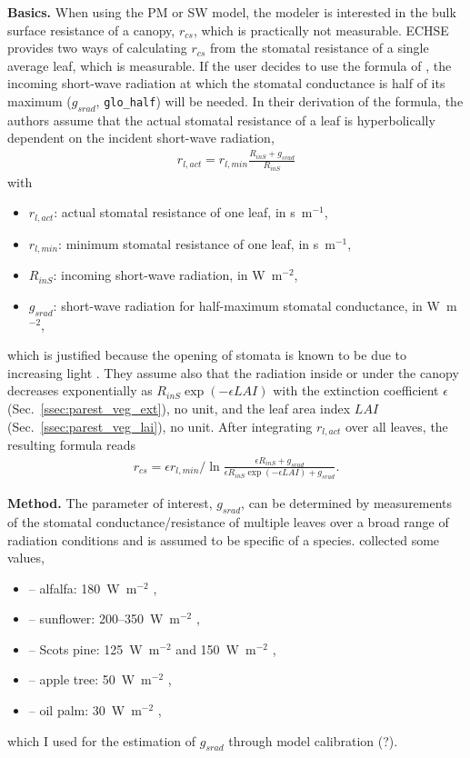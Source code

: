 \documentclass{scrreprt}
\newenvironment{denseitem}{
  \begin{itemize}
    \setlength{\itemsep}{0pt}
    \setlength{\parskip}{0pt}
    \setlength{\parsep}{0pt}
}{
  \end{itemize}
}
\begin{document}
\textbf{Basics.}
When using the PM or SW model, the modeler is interested in the bulk surface resistance of a canopy, $r_{cs}$, which is practically not measurable.
ECHSE provides two ways of calculating $r_{cs}$ from the stomatal resistance of a single average leaf, which is measurable.
If the user decides to use the formula of \citet{saugier91}, the incoming short-wave radiation at which the stomatal conductance is half of its maximum ($g_{srad}$, \verb!glo_half!) will be needed.
In their derivation of the formula, the authors assume that the actual stomatal resistance of a leaf is hyperbolically dependent on the incident short-wave radiation,
\begin{align} \label{eq:glohalf1}
  r_{l,act} = r_{l,min} \frac{R_{inS} + g_{srad}}{R_{inS}}
\end{align}
%
with
\begin{denseitem}
  \item[] $r_{l,act}$: actual stomatal resistance of one leaf, in s~m$^{-1}$,
  \item[] $r_{l,min}$: minimum stomatal resistance of one leaf, in s~m$^{-1}$,
  \item[] $R_{inS}$: incoming short-wave radiation, in W~m$^{-2}$,
  \item[] $g_{srad}$: short-wave radiation for half-maximum stomatal conductance, in W~m$^{-2}$,
\end{denseitem}
%
which is justified because the opening of stomata is known to be due to increasing light \citep{sonnewald13}.
They assume also that the radiation inside or under the canopy decreases exponentially as $R_{inS} \exp(-\epsilon LAI)$ with the extinction coefficient $\epsilon$ (Sec.~\ref{ssec:parest_veg_ext}), no unit, and the leaf area index $LAI$ (Sec.~\ref{ssec:parest_veg_lai}), no unit.
After integrating $r_{l,act}$ over all leaves, the resulting formula reads
\begin{align} \label{eq:glohalf2}
  r_{cs} = \epsilon r_{l,min} / \ln \frac{\epsilon R_{inS} + g_{srad}}{\epsilon R_{inS} \exp(-\epsilon LAI) + g_{srad}}.
\end{align}

\textbf{Method.}
The parameter of interest, $g_{srad}$, can be determined by measurements of the stomatal conductance/resistance of multiple leaves over a broad range of radiation conditions and is assumed to be specific of a species.
\citet{saugier91} collected some values,
\begin{denseitem}
  \item[--] alfalfa: 180~W~m$^{-2}$ \citep{katerji83},
  \item[--] sunflower: 200--350~W~m$^{-2}$ \citep{berger73},
  \item[--] Scots pine: 125~W~m$^{-2}$ \citep{lohammar80} and 150~W~m$^{-2}$ \citep{jarvis81},
  \item[--] apple tree: 50~W~m$^{-2}$ \citep{warrit80},
  \item[--] oil palm: 30~W~m$^{-2}$ \citep{dufrene89},
\end{denseitem}
%
which I used for the estimation of $g_{srad}$ through model calibration (?).
\end{document}
